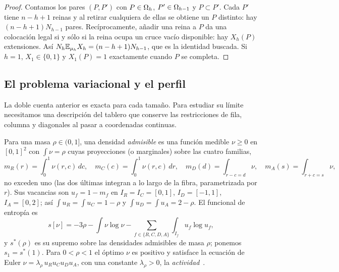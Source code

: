 \begin{proof}
Contamos los pares $(P,P')$ con $P\in\Omega_h$, $P'\in\Omega_{h-1}$ y $P\subset P'$. Cada $P'$ tiene
$n-h+1$ reinas y al retirar cualquiera de ellas se obtiene un $P$ distinto: hay
$(n-h+1)N_{h-1}$ pares. Recíprocamente, añadir una reina a $P$ da una colocación legal si y
sólo si la reina ocupa un cruce vacío disponible: hay $X_h(P)$ extensiones. Así
$N_h\mathbb{E}_{\mu_h}X_h=(n-h+1)N_{h-1}$, que es la identidad buscada. Si $h=1$, $X_1\in\{0,1\}$ y
$X_1(P)=1$ exactamente cuando $P$ se completa.
\end{proof}

\subsection{El problema variacional y el perfil}\label{subsec:variacional}

La doble cuenta anterior es exacta para cada tamaño. Para estudiar su límite
necesitamos una descripción del tablero que conserve las restricciones de fila,
columna y diagonales al pasar a coordenadas continuas.

Para una masa $\rho\in(0,1]$, una densidad \emph{admisible} es una función medible
$\nu\ge0$ en $[0,1]^2$ con $\int\nu=\rho$ cuyas proyecciones (o marginales) sobre las cuatro familias,
\[
 m_R(r)=\int_0^1\nu(r,c)\,dc,\quad m_C(c)=\int_0^1\nu(r,c)\,dr,\quad
 m_D(d)=\int_{r-c=d}\nu,\quad m_A(s)=\int_{r+c=s}\nu,
\]
no exceden uno (las dos últimas integran a lo largo de la fibra, parametrizada por $r$). Sus
vacancias son $u_f=1-m_f$ en $I_R=I_C=[0,1]$, $I_D=[-1,1]$, $I_A=[0,2]$; así
$\int u_R=\int u_C=1-\rho$ y $\int u_D=\int u_A=2-\rho$. El funcional de entropía es
\[
 s[\nu]=-3\rho-\int\nu\log\nu-\sum_{f\in\{R,C,D,A\}}\int_{I_f}u_f\log u_f ,
\]
y $s^*(\rho)$ es su supremo sobre las densidades admisibles de masa $\rho$; ponemos
$s_1=s^*(1)$. Para $0<\rho<1$ el óptimo $\nu$ es positivo y satisface la ecuación de Euler
$\nu=\lambda_\rho\,u_Ru_Cu_Du_A$, con una constante $\lambda_\rho>0$, la \emph{actividad}~\cite[Teorema~3.1
y Lema~3.3]{Perfil}.

